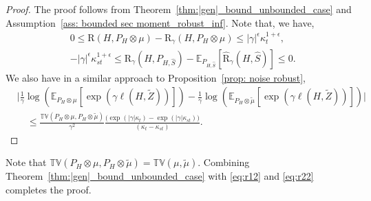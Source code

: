 \documentclass{article}
\theoremstyle{plain}
\theoremstyle{plain}
\theoremstyle{definition}
\theoremstyle{remark}
\newcommand{\RTERM}{\widehat{\mathrm{R}}_{\gamma}}
\newcommand{\RTrue}{\mathrm{R}}
\newcommand{\RTET}{\mathrm{R}_{\gamma}}
\newcommand{\mbE}{\mathbb{E}}
\begin{document}
\begin{proof}
    The proof follows from Theorem~\ref{thm:|gen|_bound_unbounded_case} and Assumption~\ref{ass: bounded sec moment_robust_inf}. Note that, we have,
     \begin{equation}\label{eq:r22}
    \begin{split}
        &0\leq   \RTrue(H, P_{H}\otimes \mu)- \RTET(H,P_{H}\otimes \mu)\leq |\gamma|^{\epsilon} \kappa_t^{1+\epsilon} ,\\
        &-|\gamma|^{\epsilon}\kappa_{st}^{1+\epsilon}\leq \RTET(H,P_{H,\hat S}) -\mbE_{P_{H,\hat S}}[\RTERM(H,\hat S)]\leq 0.
    \end{split}
    \end{equation}
We also have in a similar approach to Proposition~\ref{prop: noise robust},
 \begin{equation}\label{eq:r12}
    \begin{split}
        &\Big|\frac{1}{\gamma}\log(\mbE_{P_H\otimes \mu}[\exp(\gamma\ell(H,\tilde Z))])-\frac{1}{\gamma}\log(\mbE_{P_H\otimes \tilde{\mu}}[\exp(\gamma\ell(H,\tilde Z))])\Big|
        \\&\quad\leq \frac{\mathbb{TV}(P_H\otimes\mu,P_H\otimes \tilde{\mu})}{\gamma^2 }\frac{\Big(\exp(|\gamma|\kappa_t)-\exp(|\gamma|\kappa_{st})\Big)}{(\kappa_t-\kappa_{st})}.
        \end{split}
    \end{equation}
\end{proof}
Note that $\mathbb{TV}(P_H\otimes\mu,P_H\otimes\tilde{\mu})=\mathbb{TV}(\mu,\tilde{\mu})$. Combining Theorem~\ref{thm:|gen|_bound_unbounded_case} with \eqref{eq:r12} and \eqref{eq:r22} completes the proof.
\end{document}
